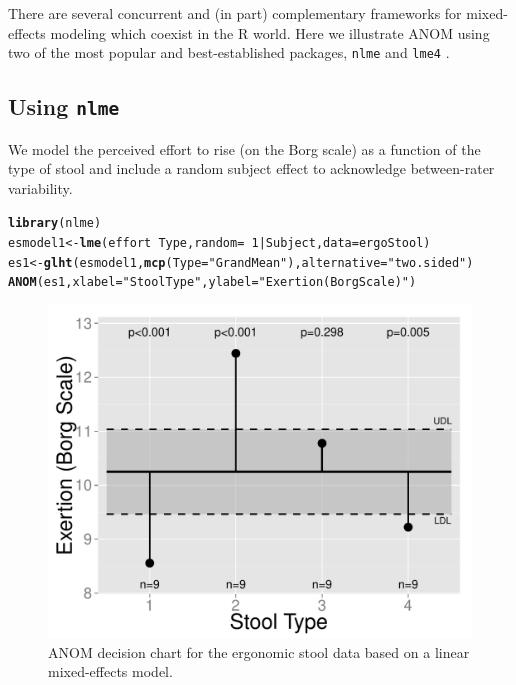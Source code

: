 \documentclass[a4paper]{article}\usepackage[]{graphicx}\usepackage[]{color}
\makeatletter
\def\maxwidth{ %
  \ifdim\Gin@nat@width>\linewidth
    \linewidth
  \else
    \Gin@nat@width
  \fi
}
\newcommand{\hlnum}[1]{\textcolor[rgb]{0.686,0.059,0.569}{#1}}%
\newcommand{\hlstr}[1]{\textcolor[rgb]{0.192,0.494,0.8}{#1}}%
\newcommand{\hlopt}[1]{\textcolor[rgb]{0,0,0}{#1}}%
\newcommand{\hlstd}[1]{\textcolor[rgb]{0.345,0.345,0.345}{#1}}%
\newcommand{\hlkwb}[1]{\textcolor[rgb]{0.69,0.353,0.396}{#1}}%
\newcommand{\hlkwc}[1]{\textcolor[rgb]{0.333,0.667,0.333}{#1}}%
\newcommand{\hlkwd}[1]{\textcolor[rgb]{0.737,0.353,0.396}{\textbf{#1}}}%
\newenvironment{kframe}{%
 \def\at@end@of@kframe{}%
 \ifinner\ifhmode%
  \def\at@end@of@kframe{\end{minipage}}%
  \begin{minipage}{\columnwidth}%
 \fi\fi%
 \def\FrameCommand##1{\hskip\@totalleftmargin \hskip-\fboxsep
 \colorbox{shadecolor}{##1}\hskip-\fboxsep
     \hskip-\linewidth \hskip-\@totalleftmargin \hskip\columnwidth}%
 \MakeFramed {\advance\hsize-\width
   \@totalleftmargin\z@ \linewidth\hsize
   \@setminipage}}%
 {\par\unskip\endMakeFramed%
 \at@end@of@kframe}
\newenvironment{knitrout}{}{} %
\makeatother
\begin{document}
There are several concurrent and (in part) complementary frameworks for mixed-effects modeling which coexist in the R world. Here we illustrate ANOM using two of the most popular and best-established packages, \texttt{nlme} \citep{Pinheiro2013} and \texttt{lme4} \citep{Bates2013}.

\subsection{Using \texttt{nlme}}

We model the perceived effort to rise (on the Borg scale) as a function of the type of stool and include a random subject effect to acknowledge between-rater variability.

\begin{knitrout}
\color{fgcolor}\begin{kframe}
\begin{alltt}
\hlkwd{library}\hlstd{(nlme)}
\hlstd{esmodel1} \hlkwb{<-} \hlkwd{lme}\hlstd{(effort} \hlopt{~} \hlstd{Type,} \hlkwc{random}\hlstd{=}\hlopt{~}\hlnum{1}\hlopt{|}\hlstd{Subject,} \hlkwc{data}\hlstd{=ergoStool)}
\hlstd{es1} \hlkwb{<-} \hlkwd{glht}\hlstd{(esmodel1,} \hlkwd{mcp}\hlstd{(}\hlkwc{Type}\hlstd{=}\hlstr{"GrandMean"}\hlstd{),} \hlkwc{alternative}\hlstd{=}\hlstr{"two.sided"}\hlstd{)}
\hlkwd{ANOM}\hlstd{(es1,} \hlkwc{xlabel}\hlstd{=}\hlstr{"Stool Type"}\hlstd{,} \hlkwc{ylabel}\hlstd{=}\hlstr{"Exertion (Borg Scale)"}\hlstd{)}
\end{alltt}
\end{kframe}\begin{figure}
\includegraphics[width=\maxwidth]{figure/NLME-1} \caption[ANOM decision chart for the ergonomic stool data based on a linear mixed-effects model]{ANOM decision chart for the ergonomic stool data based on a linear mixed-effects model.}\label{fig:NLME}
\end{figure}


\end{knitrout}
\end{document}

